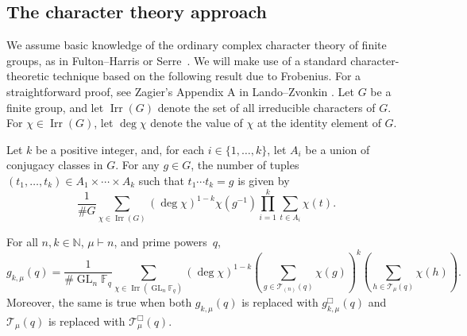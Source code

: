 \documentclass[Unicode,ALCO]{cedram}
\DeclareMathOperator{\GL}{GL}
\DeclareMathOperator{\Irr}{Irr}
\newcommand{\F}{\mathbb{F}}
\newcommand{\N}{\mathbb{N}}
\newcommand{\CT}{\mathcal{T}}
\begin{document}
\subsection{The character theory approach}
\label{approach}


We assume basic knowledge of the ordinary complex character theory of finite groups,
as in Fulton--Harris \cite{FH} or Serre~\cite{serre}.
We will make use of a standard character-theoretic technique based on the following result due to Frobenius.
For a straightforward proof, see Zagier's Appendix A in Lando--Zvonkin \cite{LZ}.
Let \(G\) be a finite group, and let \(\Irr (G)\) denote the set of all irreducible characters of \(G\).
For \(\chi \in \Irr (G)\), let \(\deg \chi\) denote the value of \(\chi\) at the identity element of \(G\).


\begin{theorem}\label{frob}
Let \(k\) be a positive integer, and, for each \(i \in \{1,\ldots,k\}\), let \(A_i\) be a union of conjugacy classes in \(G\).
For any \(g \in G\), the number of tuples \((t_1,\ldots,t_k) \in A_1 \times \cdots \times A_k\) such that \(t_1 \cdots t_k = g\) is given by
\begin{equation}
\frac{1}{\# G} \sum_{\chi \in \Irr (G)} (\deg \chi)^{1-k} \chi (g^{-1}) \prod_{i = 1}^k \sum_{t \in A_i} \chi(t).
\label{ff}
\end{equation}
\end{theorem}


\begin{corollary}
\label{ff_in_situ_corollary}
For all \(n,k \in \N\), \(\mu \vdash n\), and prime powers~\(q\),
\begin{equation}
g_{k,\mu} (q)
=
\label{ff_in_situ}
\frac{1}{\# \GL_n \F_q}
\sum_{\chi \in \Irr (\GL_n \F_q)}
(\deg \chi)^{1-k}
\left ( \sum_{g \in \CT_{(n)} (q)} \chi(g) \right )^k
\left ( \sum_{h \in \CT_\mu (q)}   \chi(h) \right ).
\end{equation}
Moreover, the same is true when both \(g_{k,\mu} (q)\) is replaced with \(g_{k,\mu}^\Box (q)\) and \(\CT_\mu (q)\) is replaced with \(\CT_\mu^\Box (q)\).
\end{corollary}
\end{document}
